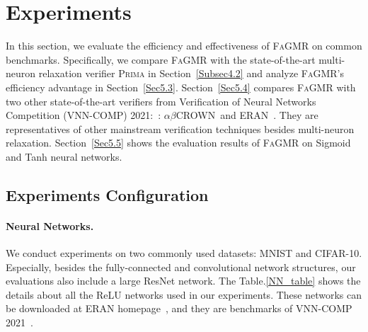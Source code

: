 \documentclass[runningheads]{llncs}
\newcommand{\ourtool}{\textsc{FaGMR}\xspace}
\newcommand{\prima}{\textsc{Prima}\xspace}
\newcommand{\mnist}{MNIST\xspace}
\newcommand{\cifar}{CIFAR-10\xspace}
\newcommand{\eran}{\textsc{ERAN}\xspace}
\newcommand{\abcrown}{\textsc{$\alpha$$\beta$CROWN}\xspace}
\newcommand{\relu}{ReLU\xspace}
\begin{document}
%
%
%

\section{Experiments}
\label{sec:experiment}
In this section, we evaluate the efficiency and effectiveness of \ourtool on 
common benchmarks.
Specifically, we compare \ourtool with the state-of-the-art multi-neuron relaxation
verifier \prima in Section~\ref{Subsec4.2} and analyze \ourtool's efficiency advantage in Section~\ref{Sec5.3}.
Section~\ref{Sec5.4} compares \ourtool with two other state-of-the-art verifiers from
Verification of Neural Networks Competition (VNN-COMP) 2021:~\cite{DBLP:journals/corr/abs-2109-00498}:
\abcrown~\cite{DBLP:conf/iclr/XuZ0WJLH21}and \eran~\cite{ref_url4}. 
They are representatives of other mainstream verification techniques besides multi-neuron relaxation. 
Section~\ref{Sec5.5} shows the evaluation results of \ourtool on Sigmoid and Tanh neural networks.

\subsection{Experiments Configuration}

\paragraph{Neural Networks.} We conduct experiments on two commonly used datasets: 
\mnist and \cifar.
Especially, besides the fully-connected and convolutional network structures, 
our evaluations also include a large ResNet network.
The Table.\ref{NN_table} shows the details about all the \relu networks 
used in our experiments.
These networks can be downloaded at ERAN homepage~\cite{ref_url4}, and they are
benchmarks of VNN-COMP 2021~\cite{DBLP:journals/corr/abs-2109-00498}.
\end{document}
